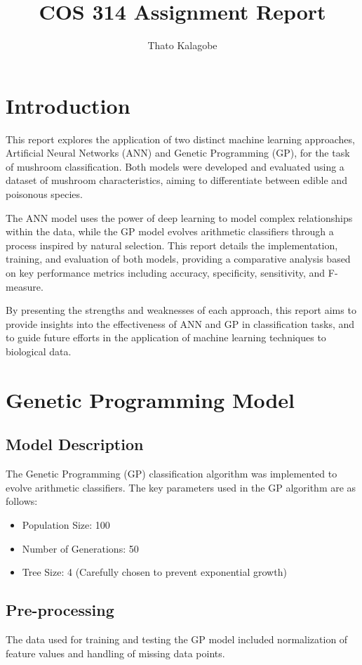 \documentclass{article}
\title{COS 314 Assignment Report}
\author{Thato Kalagobe}
\date{}
\begin{document}
\maketitle
\section{Introduction}
\label{sec:introduction}

This report explores the application of two distinct machine learning approaches, Artificial Neural Networks (ANN) and Genetic Programming (GP), for the task of mushroom classification. Both models were developed and evaluated using a dataset of mushroom characteristics, aiming to differentiate between edible and poisonous species.

The ANN model uses the power of deep learning to model complex relationships within the data, while the GP model evolves arithmetic classifiers through a process inspired by natural selection. This report details the implementation, training, and evaluation of both models, providing a comparative analysis based on key performance metrics including accuracy, specificity, sensitivity, and F-measure.

By presenting the strengths and weaknesses of each approach, this report aims to provide insights into the effectiveness of ANN and GP in classification tasks, and to guide future efforts in the application of machine learning techniques to biological data. 

\section{Genetic Programming Model}
\label{sec:gp_model}

\subsection{Model Description}
The Genetic Programming (GP) classification algorithm was implemented to evolve arithmetic classifiers. The key parameters used in the GP algorithm are as follows:
\begin{itemize}
    \item Population Size: 100
    \item Number of Generations: 50
    \item Tree Size: 4 (Carefully chosen to prevent exponential growth)
\end{itemize}

\subsection{Pre-processing}
The data used for training and testing the GP model included normalization of feature values and handling of missing data points. 
\end{document}
